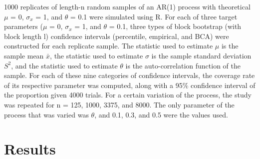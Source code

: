 \documentclass[12pt, letterpaper, titlepage]{article}
\begin{document}
1000 replicates of length-n random samples of an AR(1) process with theoretical $\mu$ = 0, $\sigma_{x}$ = 1, and $\theta$ = 0.1 were simulated using R. For each of three target parameters ($\mu$ = 0, $\sigma_{x}$ = 1, and $\theta$ = 0.1, three types of block bootstrap (with block length l) confidence intervals (percentile, empirical, and BCA) were constructed for each replicate sample. The statistic used to estimate $\mu$ is the sample mean $\bar{x}$, the statistic used to estimate $\sigma$ is the sample standard deviation $S^2$, and the statistic used to estimate $\theta$ is the auto-correlation function of the sample. For each of these nine categories of confidence intervals, the coverage rate of its respective parameter was computed, along with a 95\% confidence interval of the proportion given 4000 trials. For a certain variation of the process, the study was repeated for n = 125, 1000, 3375, and 8000. The only parameter of the process that was varied was $\theta$, and 0.1, 0.3, and 0.5 were the values used.



 

\section{Results}
\label{sec:results}
\end{document}
